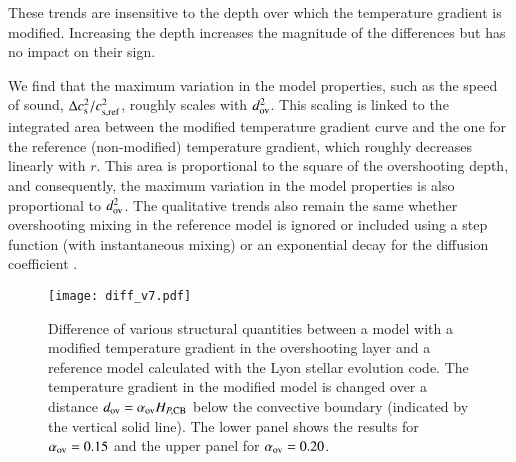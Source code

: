 \documentclass[traditabstract]{aa}
\newcommand{\3}{\ss}
\newcommand{\cp}{\citep}
\newcommand{\ct}{\citet}
\begin{document}
These trends are insensitive to the depth over which the temperature gradient is modified. Increasing  the depth increases the magnitude of the differences but has no impact on their sign.  { We find that the maximum variation in the model properties, such as the speed of sound, $\Delta c^2_{\rm s} /c^2_{\rm s,ref}$, roughly scales with $d_{\rm ov}^2$. This scaling is linked  to the integrated area between the modified temperature gradient curve and the one for the reference (non-modified) temperature gradient, which roughly decreases linearly with $r$. This area is proportional to the square of the overshooting depth, and consequently, the maximum variation in the model properties is also proportional to $d_{\rm ov}^2$.
The qualitative trends also remain the same whether overshooting mixing in the reference model is ignored or included using  a step function (with instantaneous mixing) or an exponential decay for the diffusion coefficient \cp[e.g.][]{freytag96}.



\begin{figure}[h!]
\texttt{[image: diff\_v7.pdf]}
   \caption{Difference of various structural quantities between a model with a modified temperature gradient in the overshooting layer and a reference model calculated with the Lyon stellar evolution code. The  temperature gradient in the modified model is changed over a distance $d_{\rm ov} = \alpha_{\rm ov} H_{P,{\rm CB}}$ below the convective boundary (indicated by the vertical solid line). The lower panel shows the results for  $\alpha_{\rm ov}=0.15$ and the upper panel for $\alpha_{\rm ov}=0.20$.}
 \label{diff_fig}
\end{figure}


}
\end{document}
